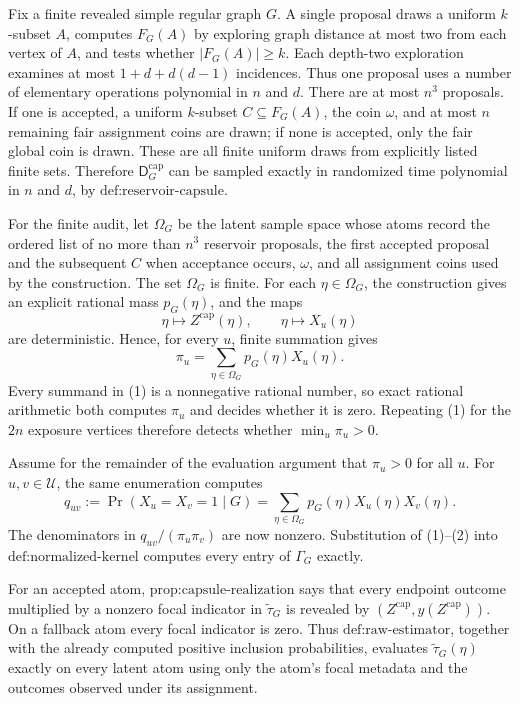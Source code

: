 Fix a finite revealed simple regular graph \(G\).  A single proposal draws a uniform \(k\)-subset \(A\), computes \(F_G(A)\) by exploring graph distance at most two from each vertex of \(A\), and tests whether \(|F_G(A)|\ge k\).  Each depth-two exploration examines at most \(1+d+d(d-1)\) incidences.  Thus one proposal uses a number of elementary operations polynomial in \(n\) and \(d\).  There are at most \(n^3\) proposals.  If one is accepted, a uniform \(k\)-subset \(C\subseteq F_G(A)\), the coin \(\omega\), and at most \(n\) remaining fair assignment coins are drawn; if none is accepted, only the fair global coin is drawn.  These are all finite uniform draws from explicitly listed finite sets.  Therefore \(\mathsf D_G^{\mathrm{cap}}\) can be sampled exactly in randomized time polynomial in \(n\) and \(d\), by \(\text{def:reservoir-capsule}\).

For the finite audit, let \(\Omega_G\) be the latent sample space whose atoms record the ordered list of no more than \(n^3\) reservoir proposals, the first accepted proposal and the subsequent \(C\) when acceptance occurs, \(\omega\), and all assignment coins used by the construction.  The set \(\Omega_G\) is finite.  For each \(\eta\in\Omega_G\), the construction gives an explicit rational mass \(p_G(\eta)\), and the maps
\[
 \eta\longmapsto Z^{\mathrm{cap}}(\eta),
 \qquad
 \eta\longmapsto X_u(\eta)
\]
are deterministic.  Hence, for every \(u\), finite summation gives
\[
 \pi_u=\sum_{\eta\in\Omega_G}p_G(\eta)X_u(\eta). \tag{1}
\]
Every summand in (1) is a nonnegative rational number, so exact rational arithmetic both computes \(\pi_u\) and decides whether it is zero.  Repeating (1) for the \(2n\) exposure vertices therefore detects whether \(\min_u\pi_u>0\).

Assume for the remainder of the evaluation argument that \(\pi_u>0\) for all \(u\).  For \(u,v\in\mathcal U\), the same enumeration computes
\[
 q_{uv}:=\Pr(X_u=X_v=1\mid G)
 =\sum_{\eta\in\Omega_G}p_G(\eta)X_u(\eta)X_v(\eta). \tag{2}
\]
The denominators in \(q_{uv}/(\pi_u\pi_v)\) are now nonzero.  Substitution of (1)--(2) into \(\text{def:normalized-kernel}\) computes every entry of \(\Gamma_G\) exactly.

For an accepted atom, \(\text{prop:capsule-realization}\) says that every endpoint outcome multiplied by a nonzero focal indicator in \(\widetilde\tau_G\) is revealed by \((Z^{\mathrm{cap}},y(Z^{\mathrm{cap}}))\).  On a fallback atom every focal indicator is zero.  Thus \(\text{def:raw-estimator}\), together with the already computed positive inclusion probabilities, evaluates \(\widetilde\tau_G(\eta)\) exactly on every latent atom using only the atom's focal metadata and the outcomes observed under its assignment.

